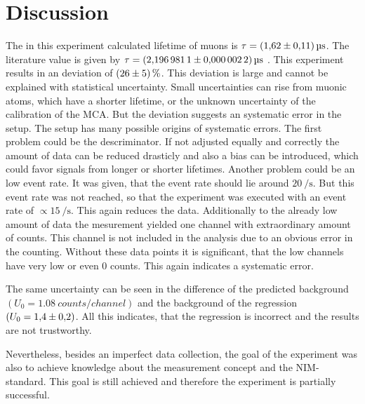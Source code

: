 \chapter{Discussion}
\label{cha:Diskussion}
The in this experiment calculated lifetime of muons is $\tau = \qty{1.62 +- 0.11}{\micro\second}$. The literature value is given by 
$\tau = \qty{2.1969811 +- 0.0000022}{\micro\second}$ \cite{PDG}. This experiment results in an deviation of $\qty{26 +- 5}{\percent}$. This deviation is large and cannot be explained 
with statistical uncertainty. Small uncertainties can rise from muonic atoms, which have a shorter lifetime, or the unknown uncertainty of the calibration of the MCA. But the 
deviation suggests an systematic error in the setup. The setup has many possible origins of systematic errors. The first problem could be the descriminator. If not adjusted equally 
and correctly the amount of data can be reduced drasticly and also a bias can be introduced, which could favor signals from longer or shorter lifetimes. Another problem could be an 
low event rate. It was given, that the event rate should lie around $\qty{20}{\per\second}$. But this event rate was not reached, so that the experiment was executed with an event rate 
of $\propto \qty{15}{\per\second}$. This again reduces the data. Additionally to the already low amount of data the mesurement yielded one channel with extraordinary amount of 
counts. This channel is not included in the analysis due to an obvious error in the counting. Without these data points it is significant, that the low channels have very low or even 
0 counts. This again indicates a systematic error. 

The same uncertainty can be seen in the difference of the predicted background $(U_0 = \qty{1.08}{counts\per channel})$ and the background of the regression $(U_0 = \num{1.4 +- 0.2})$.
All this indicates, that the regression is incorrect and the results are not trustworthy. 

Nevertheless, besides an imperfect data collection, the goal of the experiment was also to achieve knowledge about the measurement concept and the NIM-standard. This goal is still 
achieved and therefore the experiment is partially  successful.
